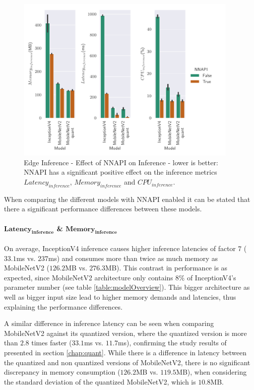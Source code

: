 \begin{figure}[!htb]
\centering
\includegraphics[width=0.96\textwidth]{./Bilder/single_plots/edge_inference_plots/NNAPI_behavior.pdf}
\caption[Edge Inference - Effect of NNAPI on Inference]{Edge Inference - Effect of NNAPI on Inference - lower is better: NNAPI has a significant positive effect on the inference metrics $Latency_{inference}$, $Memory_{inference}$ and $CPU_{inference}$.}
\label{fig:NNAPI}
\end{figure}

When comparing the different models with NNAPI enabled it can be stated that there a significant performance differences between these models.
\paragraph{$\mathbf{Latency_{inference}}$ \& $\mathbf{Memory_{inference}}$}
On average, InceptionV4 inference causes higher inference latencies of factor $7$ ($33.1$ms vs. $237$ms) and consumes more than twice as much memory as MobileNetV2 ($126.2$MB vs. $276.3$MB).
This contrast in performance is as expected, since MobileNetV2 architecture only contains $8\%$ of InceptionV4's parameter number (see table \ref{table:modelOverview}).
This bigger architecture as well as bigger input size lead to higher memory demands and latencies, thus explaining the performance differences.

A similar difference in inference latency can be seen when comparing MobileNetV2 against its quantized version, where the quantized version is more than $2.8$ times faster ($33.1$ms vs. $11.7$ms), confirming the study results of \cite{Quantizing} presented in section \ref{chap:quant}.
While there is a difference in latency between the quantized and non quantized versions of MobileNetV2, there is no significant discrepancy in memory consumption ($126.2$MB vs. $119.5$MB), when considering the standard deviation of the quantized MobileNetV2, which is $10.8$MB.


